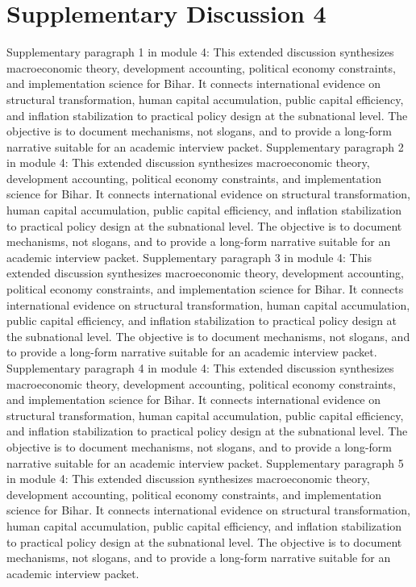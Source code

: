 \documentclass[preprint,12pt]{elsarticle}
\begin{document}
\section{Supplementary Discussion 4}
Supplementary paragraph 1 in module 4: This extended discussion synthesizes macroeconomic theory, development accounting, political economy constraints, and implementation science for Bihar. It connects international evidence on structural transformation, human capital accumulation, public capital efficiency, and inflation stabilization to practical policy design at the subnational level. The objective is to document mechanisms, not slogans, and to provide a long-form narrative suitable for an academic interview packet.
Supplementary paragraph 2 in module 4: This extended discussion synthesizes macroeconomic theory, development accounting, political economy constraints, and implementation science for Bihar. It connects international evidence on structural transformation, human capital accumulation, public capital efficiency, and inflation stabilization to practical policy design at the subnational level. The objective is to document mechanisms, not slogans, and to provide a long-form narrative suitable for an academic interview packet.
Supplementary paragraph 3 in module 4: This extended discussion synthesizes macroeconomic theory, development accounting, political economy constraints, and implementation science for Bihar. It connects international evidence on structural transformation, human capital accumulation, public capital efficiency, and inflation stabilization to practical policy design at the subnational level. The objective is to document mechanisms, not slogans, and to provide a long-form narrative suitable for an academic interview packet.
Supplementary paragraph 4 in module 4: This extended discussion synthesizes macroeconomic theory, development accounting, political economy constraints, and implementation science for Bihar. It connects international evidence on structural transformation, human capital accumulation, public capital efficiency, and inflation stabilization to practical policy design at the subnational level. The objective is to document mechanisms, not slogans, and to provide a long-form narrative suitable for an academic interview packet.
Supplementary paragraph 5 in module 4: This extended discussion synthesizes macroeconomic theory, development accounting, political economy constraints, and implementation science for Bihar. It connects international evidence on structural transformation, human capital accumulation, public capital efficiency, and inflation stabilization to practical policy design at the subnational level. The objective is to document mechanisms, not slogans, and to provide a long-form narrative suitable for an academic interview packet.
\end{document}
